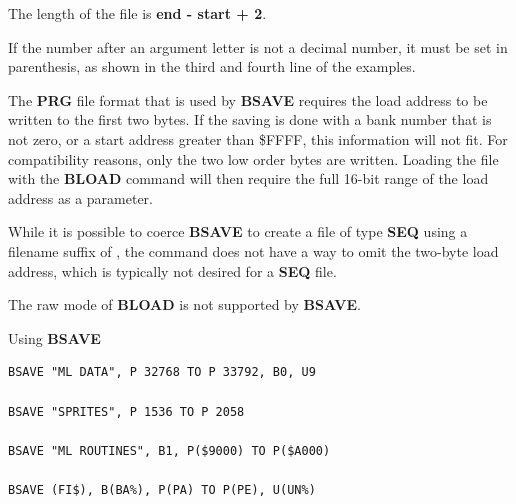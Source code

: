 \begin{description}[leftmargin=2cm,style=nextline]
                  \drivedefinition

                  \unitdefinition

\item [Remarks:]  The length of the file is {\bf end - start + 2}.

                  If the number after an argument letter is not a decimal number, it must be set in parenthesis, as shown in the third and fourth line of the examples.

                  The {\bf PRG} file format that is used by {\bf BSAVE} requires the load address to be written to the first two bytes. If the saving is done with a bank number that is not zero, or a start address greater than \$FFFF, this information will not fit. For compatibility reasons, only the two low order bytes are written. Loading the file with the {\bf BLOAD} command will then require the full 16-bit range of the load address as a parameter.

                  While it is possible to coerce {\bf BSAVE} to create a file of type {\bf SEQ} using a filename suffix of , the command does not have a way to omit the two-byte load address, which is typically not desired for a {\bf SEQ} file.
                  
                  The raw mode of {\bf BLOAD} is not supported by {\bf BSAVE}.

\item [Examples:] Using {\bf BSAVE}

\begin{tcolorbox}[colback=black,coltext=white]
\verbatimfont{\codefont}
\begin{verbatim}
BSAVE "ML DATA", P 32768 TO P 33792, B0, U9

BSAVE "SPRITES", P 1536 TO P 2058

BSAVE "ML ROUTINES", B1, P($9000) TO P($A000)

BSAVE (FI$), B(BA%), P(PA) TO P(PE), U(UN%)
\end{verbatim}
\end{tcolorbox}
\end{description}


\newpage
